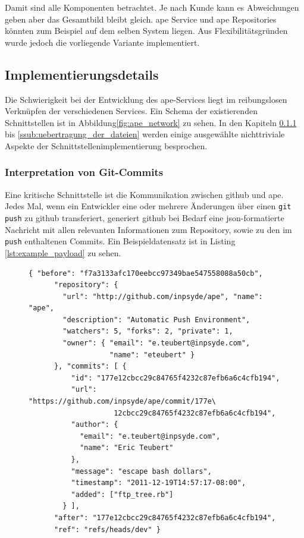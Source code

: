 Damit sind alle Komponenten betrachtet. Je nach Kunde kann es Abweichungen geben aber das Gesamtbild bleibt gleich. \gls{ape} Service und \gls{ape} Repositories könnten zum Beispiel auf dem selben System liegen. Aus Flexibilitätsgründen wurde jedoch die vorliegende Variante implementiert.



\subsection{Implementierungsdetails} %
\label{sub:implementierungsdetails}

Die Schwierigkeit bei der Entwicklung des \gls{ape}-Services liegt im reibungslosen Verknüpfen der verschiedenen Services. Ein Schema der existierenden Schnittstellen ist in Abbildung\ref{fig:ape_network} zu sehen. In den Kapiteln \ref{ssub:interpretation_von_git_commits} bis \ref{ssub:uebertragung_der_dateien} werden einige ausgewählte nichttriviale Aspekte der Schnittstellenimplementierung besprochen.

\subsubsection{Interpretation von Git-Commits} %
\label{ssub:interpretation_von_git_commits}

Eine kritische Schnittstelle ist die Kommunikation zwischen \gls{github} und \gls{ape}. Jedes Mal, wenn ein Entwickler eine oder mehrere Änderungen über einen \lstinline!git push! zu \gls{github} transferiert, generiert \gls{github} bei Bedarf eine \gls{json}-formatierte Nachricht mit allen relevanten Informationen zum Repository, sowie zu den im \lstinline!push! enthaltenen Commits. Ein Beispieldatensatz ist in Listing \ref{lst:example_payload} zu sehen.

\begin{figure}
	\begin{lstlisting}[caption=Beispiel-Webhook von \gls{github},label={lst:example_payload}]
	{ "before": "f7a3133afc170eebcc97349bae547558088a50cb",
	  "repository": {
	    "url": "http://github.com/inpsyde/ape", "name": "ape",
	    "description": "Automatic Push Environment",
	    "watchers": 5, "forks": 2, "private": 1,
	    "owner": { "email": "e.teubert@inpsyde.com",
	               "name": "eteubert" }
	  }, "commits": [ {
	      "id": "177e12cbcc29c84765f4232c87efb6a6c4cfb194",
	      "url": "https://github.com/inpsyde/ape/commit/177e\
					12cbcc29c84765f4232c87efb6a6c4cfb194",
	      "author": {
	        "email": "e.teubert@inpsyde.com",
	        "name": "Eric Teubert"
	      },
	      "message": "escape bash dollars",
	      "timestamp": "2011-12-19T14:57:17-08:00",
	      "added": ["ftp_tree.rb"]
	    } ],
	  "after": "177e12cbcc29c84765f4232c87efb6a6c4cfb194",
	  "ref": "refs/heads/dev" }
	\end{lstlisting}
\end{figure}

